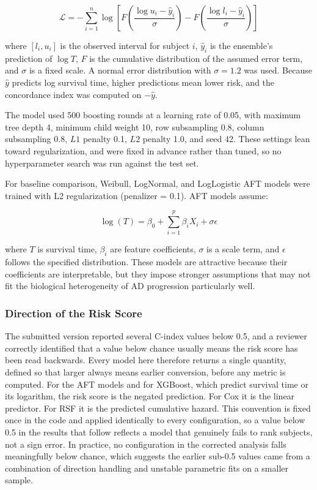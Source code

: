 \documentclass[blue]{ludusofficial}  %
\begin{document}
\begin{equation}
    \mathcal{L} = -\sum_{i=1}^{n} \log \left[ F\!\left(\frac{\log u_i - \hat{y}_i}{\sigma}\right) - F\!\left(\frac{\log l_i - \hat{y}_i}{\sigma}\right) \right]
\end{equation}

where $[l_i, u_i]$ is the observed interval for subject $i$, $\hat{y}_i$ is the ensemble's prediction of $\log T$, $F$ is the cumulative distribution of the assumed error term, and $\sigma$ is a fixed scale. A normal error distribution with $\sigma = 1.2$ was used. Because $\hat{y}$ predicts log survival time, higher predictions mean lower risk, and the concordance index was computed on $-\hat{y}$.

The model used 500 boosting rounds at a learning rate of 0.05, with maximum tree depth 4, minimum child weight 10, row subsampling 0.8, column subsampling 0.8, $L1$ penalty 0.1, $L2$ penalty 1.0, and seed 42. These settings lean toward regularization, and were fixed in advance rather than tuned, so no hyperparameter search was run against the test set.

For baseline comparison, Weibull, LogNormal, and LogLogistic AFT models were trained with L2 regularization (penalizer = 0.1). AFT models assume:

\begin{equation}
    \log(T) = \beta_0 + \sum_{i=1}^{p} \beta_i X_i + \sigma \epsilon
\end{equation}

where $T$ is survival time, $\beta_i$ are feature coefficients, $\sigma$ is a scale term, and $\epsilon$ follows the specified distribution. These models are attractive because their coefficients are interpretable, but they impose stronger assumptions that may not fit the biological heterogeneity of AD progression particularly well.

\subsubsection{Direction of the Risk Score}
\label{sec:direction}

The submitted version reported several C-index values below 0.5, and a reviewer correctly identified that a value below chance usually means the risk score has been read backwards. Every model here therefore returns a single quantity, defined so that larger always means earlier conversion, before any metric is computed. For the AFT models and for XGBoost, which predict survival time or its logarithm, the risk score is the negated prediction. For Cox it is the linear predictor. For RSF it is the predicted cumulative hazard. This convention is fixed once in the code and applied identically to every configuration, so a value below 0.5 in the results that follow reflects a model that genuinely fails to rank subjects, not a sign error. In practice, no configuration in the corrected analysis falls meaningfully below chance, which suggests the earlier sub-0.5 values came from a combination of direction handling and unstable parametric fits on a smaller sample.
\end{document}
